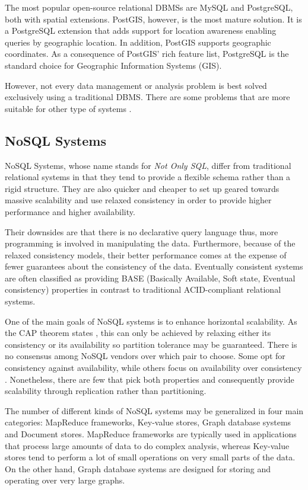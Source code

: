 The most popular open-source relational DBMSs are MySQL and PostgreSQL, both with spatial extensions. PostGIS, however, is the most mature solution. It is a PostgreSQL extension that adds support for location awareness enabling queries by geographic location. In addition, PostGIS supports geographic coordinates. As a consequence of PostGIS' rich feature list, PostgreSQL is the standard choice for Geographic Information Systems (GIS).

However, not every data management or analysis problem is best solved exclusively using a traditional DBMS. There are some problems that are more suitable for other type of systems \cite{NoSQL-use-cases}.

\subsection{NoSQL Systems}

NoSQL Systems, whose name stands for \textit{Not Only SQL}, differ from traditional relational systems in that they tend to provide a flexible schema rather than a rigid structure. They are also quicker and cheaper to set up geared towards massive scalability and use relaxed consistency in order to provide higher performance and higher availability.

Their downsides are that there is no declarative query language thus, more programming is involved in manipulating the data. Furthermore, because of the relaxed consistency models, their better performance comes at the expense of fewer guarantees about the consistency of the data. Eventually consistent systems are often classified as providing BASE (Basically Available, Soft state, Eventual consistency) properties in contrast to traditional ACID-compliant relational systems.

One of the main goals of NoSQL systems is to enhance horizontal scalability. As the CAP theorem states \cite{CAP-theorem}\cite{CAP:online}, this can only be achieved by relaxing either its consistency or its availability so partition tolerance may be guaranteed. There is no consensus among NoSQL vendors over which pair to choose. Some opt for consistency against availability, while others focus on availability over consistency \cite{CAP-NoSQL}. Nonetheless, there are few that pick both properties and consequently provide scalability through replication rather than partitioning.

The number of different kinds of NoSQL systems may be generalized in four main categories: MapReduce frameworks, Key-value stores, Graph database systems and Document stores. MapReduce frameworks are typically used in applications that process large amounts of data to do complex analysis, whereas Key-value stores tend to perform a lot of small operations on very small parts of the data. On the other hand, Graph database systems are designed for storing and operating over very large graphs.

